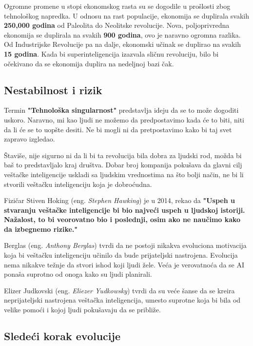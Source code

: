 \documentclass[a4paper]{article}
\begin{document}
Ogromne promene u stopi ekonomskog rasta su se dogodile u prošlosti zbog tehnološkog napredka. U odnosu na rast populacije, ekonomija se duplirala svakih \textbf{250,000 godina} od Paleolita do Neolitske revolucije. Nova, poljoprivredna ekonomija se duplirala na svakih \textbf{900 godina}, ovo je naravno ogromna razlika. Od Industrijske Revolucije pa na dalje, ekonomski učinak se duplirao na svakih \textbf{15 godina}. Kada bi superinteligencija izazvala sličnu revoluciju, bilo bi očekivano da se ekonomija duplira na nedeljnoj bazi čak.

\subsection{Nestabilnost i rizik}
\label{subsec:nestabilnost_i_rizik}
\hfill

Termin \textbf{"Tehnološka singularnost"} predstavlja ideju da se to može dogoditi uskoro. Naravno, mi kao ljudi ne možemo da predpostavimo kada će to biti, niti da li će se to uopšte desiti. Ne bi mogli ni da pretpostavimo kako bi taj svet zapravo izgledao. 

Štaviše, nije sigurno ni da li bi ta revolucija bila dobra za ljudski rod, možda bi baš to predstavljalo kraj društva. Dobar broj kompanija pokušava da glavni cilj veštačke inteligencije uskladi sa ljudskim vrednostima na što bolji način, ne bi li stvorili veštačku inteligenciju koja je dobroćudna.

Fizičar Stiven Hoking (eng. \textit{Stephen Hawking}) je u 2014, rekao da \textbf{"Uspeh u stvaranju veštačke inteligencije bi bio najveći uspeh u ljudskoj istoriji. Nažalost, to bi veorovatno bio i poslednji, osim ako ne naučimo kako da izbegnemo rizike."}\cite{r2}

Berglas (eng. \textit{Anthony Berglas}) tvrdi da ne postoji nikakva evoluciona motivacija koja bi veštačku inteligenciju učinilo da bude prijateljski nastrojena. Evolucija nema nikakve težnje da stvori ishod koji ljudi žele. Veća je verovatnoća da se AI ponaša suprotno od onoga kako su ljudi planirali.

Elizer Judkovski (eng. \textit{Eliezer Yudkowsky}) tvrdi da su veće šanse da se kreira neprijateljski nastrojena veštačka inteligencija, umesto suprotne koja bi bila od velike pomoći i kojoj ljudi pokušavaju da se približe.

\subsection{Sledeći korak evolucije}
\label{subsec:sledeći_korak_evolucije}
\hfill
\end{document}
